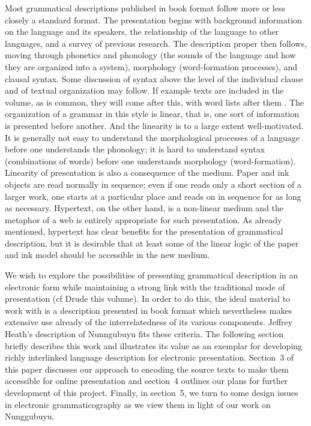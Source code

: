 Most grammatical descriptions published in book format follow more or less closely a standard format. The presentation begins with background information on the language and its speakers, the relationship of the language to other languages, and a survey of previous research. The description proper then follows, moving through phonetics and phonology (the sounds of the language and how they are organized into a system), morphology (word-formation processes), and clausal syntax. Some discussion of syntax above the level of the individual clause and of textual organization may follow. If example texts are included in the volume, as is common, they will come after this, with word lists after them \citep{Nordhofftv}. The organization of a grammar in this style is linear, that is, one sort of information is presented before another. And the linearity is to a large extent well-motivated. It is generally not easy to understand the morphological processes of a language before one understands the phonology; it is hard to understand syntax (combinations of words) before one understands morphology (word-formation). Linearity of presentation is also a consequence of the medium. Paper and ink objects are read normally in sequence; even if one reads only a short section of a larger work, one starts at a particular place and reads on in sequence for as long as necessary. Hypertext, on the other hand, is a non-linear medium and the metaphor of a web is entirely appropriate for such presentation. As already mentioned, hypertext has clear benefits for the presentation of grammatical description, but it is desirable that at least some of the linear logic of the paper and ink model should be accessible in the new medium.

We wish to explore the possibilities of presenting grammatical description in an electronic form while maintaining a strong link with the traditional mode of presentation (cf Drude this volume). In order to do this, the ideal material to work with is a description presented in book format which nevertheless makes extensive use already of the interrelatedness of its various components. Jeffrey Heath's description of Nunngubuyu fits these criteria. The following section briefly describes this work and illustrates its value as an exemplar for developing richly interlinked language description for electronic presentation. Section~3 of this paper discusses our approach to encoding the source texts to make them accessible for online presentation and section~4 outlines our plans for further development of this project. Finally, in section~5, we turn to some design issues in electronic grammaticography as we view them in light of our work on Nunggubuyu. 


